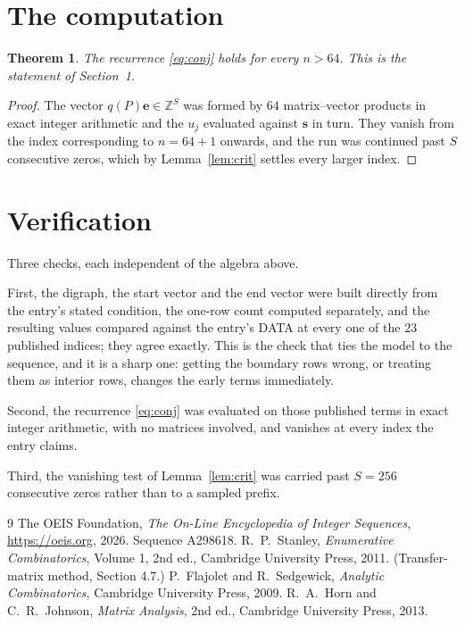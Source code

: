 \documentclass[11pt,a4paper]{article}
\theoremstyle{plain}
\newtheorem{theorem}{Theorem}
\theoremstyle{definition}
\begin{document}
\section{The computation}

\begin{theorem}
The recurrence \eqref{eq:conj} holds for every $n>64$. This is the statement of
Section~1.
\end{theorem}

\begin{proof}
The vector $q(P)\mathbf{e}\in\mathbb{Z}^{S}$ was formed by $64$ matrix--vector
products in exact integer arithmetic and the $u_j$ evaluated against $\mathbf{s}$ in turn.
They vanish from the index corresponding to $n=64+1$ onwards, and the run was continued
past $S$ consecutive zeros, which by Lemma~\ref{lem:crit} settles every larger index.
\end{proof}

\section{Verification}

Three checks, each independent of the algebra above.

First, the digraph, the start vector and the end vector were built directly from the
entry's stated condition, the one-row count computed separately, and the resulting values
compared against the entry's DATA at every one of the $23$ published indices; they
agree exactly. This is the check that ties the model to the sequence, and it is a sharp one:
getting the boundary rows wrong, or treating them as interior rows, changes the early terms
immediately.

Second, the recurrence \eqref{eq:conj} was evaluated on those published terms in exact
integer arithmetic, with no matrices involved, and vanishes at every index the entry claims.

Third, the vanishing test of Lemma~\ref{lem:crit} was carried past $S=256$ consecutive
zeros rather than to a sampled prefix.

\begin{thebibliography}{9}
 The OEIS Foundation, \emph{The On-Line Encyclopedia of Integer
Sequences}, \url{https://oeis.org}, 2026. Sequence A298618.
 R.~P.~Stanley, \emph{Enumerative Combinatorics}, Volume 1, 2nd ed.,
Cambridge University Press, 2011. (Transfer-matrix method, Section 4.7.)
 P.~Flajolet and R.~Sedgewick, \emph{Analytic Combinatorics}, Cambridge
University Press, 2009.
 R.~A.~Horn and C.~R.~Johnson, \emph{Matrix Analysis}, 2nd ed., Cambridge
University Press, 2013.
\end{thebibliography}
\end{document}
